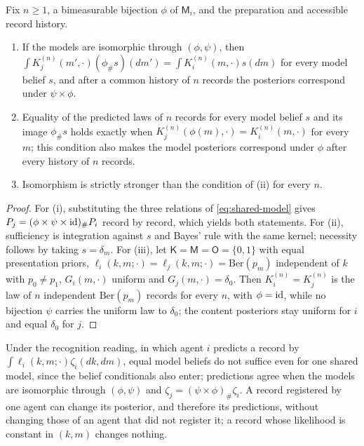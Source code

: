 Fix $n\ge1$, a bimeasurable bijection $\phi$ of $\mathsf M_i$, and the preparation and accessible record history.
\begin{enumerate}
\item[(i)] If the models are isomorphic through $(\phi,\psi)$, then $\int K_j^{(n)}(m',\cdot)(\phi_\#s)(dm')=\int K_i^{(n)}(m,\cdot)s(dm)$ for every model belief $s$, and after a common history of $n$ records the posteriors correspond under $\psi\times\phi$.
\item[(ii)] Equality of the predicted laws of $n$ records for every model belief $s$ and its image $\phi_\#s$ holds exactly when $K_j^{(n)}(\phi(m),\cdot)=K_i^{(n)}(m,\cdot)$ for every $m$; this condition also makes the model posteriors correspond under $\phi$ after every history of $n$ records.
\item[(iii)] Isomorphism is strictly stronger than the condition of (ii) for every $n$.
\end{enumerate}
\begin{proof}
For (i), substituting the three relations of \cref{eq:shared-model} gives $P_j=(\phi\times\psi\times\mathrm{id})_\#P_i$ record by record, which yields both statements. For (ii), sufficiency is integration against $s$ and Bayes' rule with the same kernel; necessity follows by taking $s=\delta_m$. For (iii), let $\mathsf K=\mathsf M=\mathsf O=\{0,1\}$ with equal presentation priors, $\ell_i(k,m;\cdot)=\ell_j(k,m;\cdot)=\mathrm{Ber}(p_m)$ independent of $k$ with $p_0\ne p_1$, $G_i(m,\cdot)$ uniform and $G_j(m,\cdot)=\delta_0$. Then $K_i^{(n)}=K_j^{(n)}$ is the law of $n$ independent $\mathrm{Ber}(p_m)$ records for every $n$, with $\phi=\mathrm{id}$, while no bijection $\psi$ carries the uniform law to $\delta_0$; the content posteriors stay uniform for $i$ and equal $\delta_0$ for $j$.
\end{proof}
Under the recognition reading, in which agent $i$ predicts a record by $\int\ell_i(k,m;\cdot)\zeta_i(dk,dm)$, equal model beliefs do not suffice even for one shared model, since the belief conditionals also enter; predictions agree when the models are isomorphic through $(\phi,\psi)$ and $\zeta_j=(\psi\times\phi)_\#\zeta_i$. A record registered by one agent can change its posterior, and therefore its predictions, without changing those of an agent that did not register it; a record whose likelihood is constant in $(k,m)$ changes nothing.

